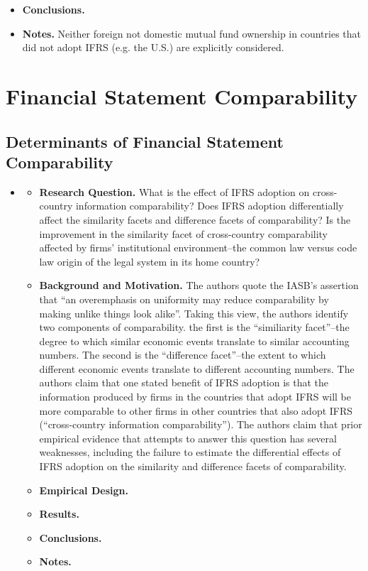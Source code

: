 \documentclass[12pt, letterpaper]{article}
\begin{document}
\begin{itemize}
\begin{itemize}
    \item \textbf{Conclusions.}

    \item \textbf{Notes.} Neither foreign not domestic mutual fund ownership in countries that did not adopt IFRS (e.g. the U.S.) are explicitly considered.
    \end{itemize}
    
    
\end{itemize}

\section{Financial Statement Comparability}
\subsection{Determinants of Financial Statement Comparability}
\begin{itemize}
\item  \cite{yipyoung2012}
   \begin{itemize}
    \item \textbf{Research Question.} What is the effect of IFRS adoption on cross-country 
information comparability? Does IFRS adoption differentially affect the similarity facets and difference facets of comparability? Is the improvement in the similarity facet of cross-country comparability affected by firms’ institutional environment--the common law versus code law origin of the legal system in its home country?

    \item{\textbf{Background and Motivation.}} The authors quote the IASB's assertion that ``an overemphasis on uniformity may reduce comparability by making unlike things look alike''. Taking this view, the authors identify two components of comparability. the first is the ``similiarity facet''--the degree to which similar economic events translate to similar accounting numbers. The second is the ``difference facet''--the extent to which different economic events translate to different accounting numbers. The authors claim that one stated benefit of IFRS adoption is that the information produced by firms in the countries that adopt IFRS will be more comparable to other firms in other countries that also adopt IFRS (``cross-country information comparability''). The authors claim that prior empirical evidence that attempts to answer this question has several weaknesses, including the failure to estimate the differential effects of IFRS adoption on the similarity and difference facets of comparability.

    \item \textbf{Empirical Design.}
    \item \textbf{Results.}
    \item \textbf{Conclusions.}
    \item \textbf{Notes.} 
    \end{itemize}

\end{itemize}
\end{document}
